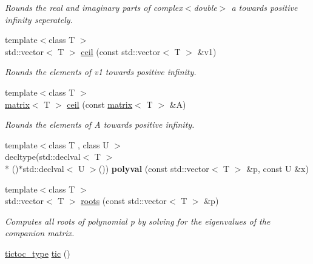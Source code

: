\begin{DoxyCompactItemize}
\begin{DoxyCompactList}\small\item\em Rounds the real and imaginary parts of complex$<$double$>$ a towards positive infinity seperately. \end{DoxyCompactList}\item 
\hypertarget{namespacekeycpp_adb46ebfbb914f186bcb1859f39dfae91}{{\footnotesize template$<$class T $>$ }\\std\-::vector$<$ T $>$ \hyperlink{namespacekeycpp_adb46ebfbb914f186bcb1859f39dfae91}{ceil} (const std\-::vector$<$ T $>$ \&v1)}\label{namespacekeycpp_adb46ebfbb914f186bcb1859f39dfae91}

\begin{DoxyCompactList}\small\item\em Rounds the elements of v1 towards positive infinity. \end{DoxyCompactList}\item 
\hypertarget{namespacekeycpp_a4bba31744fef3693901a075fda07857c}{{\footnotesize template$<$class T $>$ }\\\hyperlink{classkeycpp_1_1matrix}{matrix}$<$ T $>$ \hyperlink{namespacekeycpp_a4bba31744fef3693901a075fda07857c}{ceil} (const \hyperlink{classkeycpp_1_1matrix}{matrix}$<$ T $>$ \&A)}\label{namespacekeycpp_a4bba31744fef3693901a075fda07857c}

\begin{DoxyCompactList}\small\item\em Rounds the elements of A towards positive infinity. \end{DoxyCompactList}\item 
\hypertarget{namespacekeycpp_a136df5d07e95d472b1a38d3fd71b3a3f}{{\footnotesize template$<$class T , class U $>$ }\\decltype(std\-::declval$<$ T $>$\\*
()$\ast$std\-::declval$<$ U $>$()) {\bfseries polyval} (const std\-::vector$<$ T $>$ \&p, const U \&x)}\label{namespacekeycpp_a136df5d07e95d472b1a38d3fd71b3a3f}

\item 
\hypertarget{namespacekeycpp_a7752b443d306871030c8867467fe6cc9}{{\footnotesize template$<$class T $>$ }\\std\-::vector$<$ T $>$ \hyperlink{namespacekeycpp_a7752b443d306871030c8867467fe6cc9}{roots} (const std\-::vector$<$ T $>$ \&p)}\label{namespacekeycpp_a7752b443d306871030c8867467fe6cc9}

\begin{DoxyCompactList}\small\item\em Computes all roots of polynomial p by solving for the eigenvalues of the companion matrix. \end{DoxyCompactList}\item 
\hypertarget{namespacekeycpp_a6069a9eec0edfa1d401230013d98765e}{\hyperlink{structkeycpp_1_1tictoc__type}{tictoc\-\_\-type} \hyperlink{namespacekeycpp_a6069a9eec0edfa1d401230013d98765e}{tic} ()}\label{namespacekeycpp_a6069a9eec0edfa1d401230013d98765e}


\end{DoxyCompactItemize}
